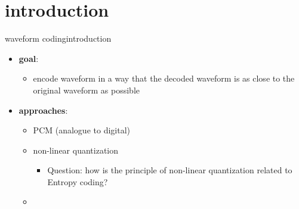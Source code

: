 


\subtitle{Part 25: Waveform Coding}


	

\section[intro]{introduction}

	\begin{frame}{waveform coding}{introduction}
        \begin{itemize}
            \item   \textbf{goal}: 
                \begin{itemize}
                    \item   encode waveform in a way that the decoded waveform is as close to the original waveform as possible
                \end{itemize}
            \pause
            \bigskip
            \item   \textbf{approaches}:
                \begin{itemize}
                    \item   PCM (analogue to digital)
                    \pause
                    \smallskip
                    \item   non-linear quantization 
                    \pause
                        \begin{itemize}
                            \item   Question: how is the principle of non-linear quantization related to Entropy coding?
                        \end{itemize}
                    \pause
                    \smallskip
                    \item   {}
                \end{itemize}
        \end{itemize}
	\end{frame}
